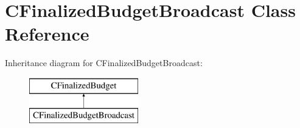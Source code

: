 \hypertarget{class_c_finalized_budget_broadcast}{}\section{C\+Finalized\+Budget\+Broadcast Class Reference}
\label{class_c_finalized_budget_broadcast}
Inheritance diagram for C\+Finalized\+Budget\+Broadcast\+:\begin{figure}[H]
\begin{center}
\leavevmode
\includegraphics[height=2.000000cm]{class_c_finalized_budget_broadcast}
\end{center}
\end{figure}
